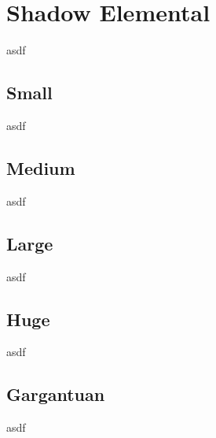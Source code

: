 \section{Shadow Elemental}

asdf

\subsection{Small}

asdf

\subsection{Medium}

asdf

\subsection{Large}

asdf

\subsection{Huge}

asdf

\subsection{Gargantuan}

asdf